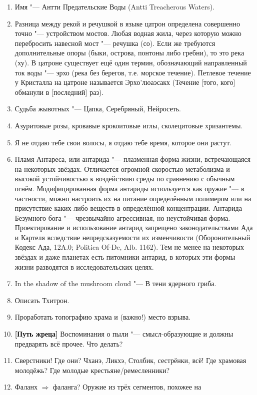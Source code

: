 \documentclass[a4paper,10pt]{book}
\begin{document}
\begin{enumerate}
\item Имя "--- Антти Предательские Воды (Antti Treacherous Waters).
\item Разница между рекой и речушкой в языке цатрон определена совершенно точно 
"---
устройством мостов. Любая водная жила, через которую можно перебросить навесной
мост "--- речушка (со). Если же требуются дополнительные опоры (быки, острова, 
понтоны либо
гребни), то это река (ху). В цатроне существует ещё один термин, обозначающий 
направленный ток воды
"--- эрхо (река без берегов, т.е. морское течение). Петлевое течение у 
Кристалла на цатроне называется
Эрхо'люаэсакх (Течение [того, кого] обманули в [последний] раз).

\item Судьба жывотных "--- Цапка, Серебряный, Нейросеть.
\item Азуритовые розы, кровавые крокоитовые иглы, сколецитовые хризантемы.
\item Я не отдаю тебе свои волосы, я отдаю тебе время, которое они растут.
\item Пламя Антареса, или антарида "--- плазменная форма жизни, встречающаяся 
на 
некоторых звёздах. Отличается огромной скоростью метаболизма и высокой 
устойчивостью к воздействию среды по сравнению с обычным огнём. 
Модифицированная 
форма антариды используется как оружие "--- в частности, можно настроить их на 
питание определённым полимером или на присутствие каких-либо веществ в 
определённой концентрации. Антарида Безумного бога "--- чрезвычайно 
агрессивная, 
но неустойчивая форма. Проектирование и использование антарид запрещено 
законодательствами Ада и Картеля вследствие непредсказуемости их изменчивости 
(Оборонительный Кодекс Ада, 12A.0; Politica Of-De, Alb. 1162). Тем не менее на 
некоторых звёздах и даже планетах есть питомники антарид, в которых эти формы 
жизни разводятся в исследовательских целях.
\item In the shadow of the mushroom cloud "--- В тени ядерного гриба.
\item Описать Тхитрон.
\item Проработать топографию храма и (важно!) место взрыва.
\item \textbf{[Путь жреца]} Воспоминания о пыли "--- смысл-образующие и должны 
предварять всё прочее. Что делать?
\item Сверстники! Где они? Чханэ, Ликхэ, Столбик, сестрёнки, всё! Где храмовая 
молодёжь? Где молодые крестьяне/ремесленники?
\item Фаланх $\Longrightarrow$ фаланга? Оружие из трёх сегментов, похожее на 

\end{enumerate}
\end{document}
